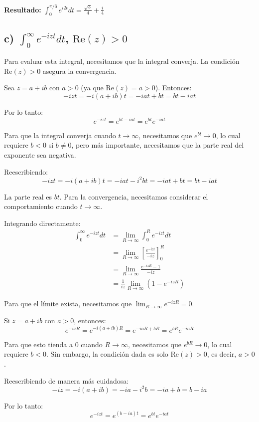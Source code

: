 \documentclass{article}
\begin{document}
\textbf{Resultado:} $\int_0^{\pi/6} e^{i2t} dt = \frac{\sqrt{3}}{4} + \frac{i}{4}$

\subsection*{c) $\int_0^{\infty} e^{-izt} dt$, $\text{Re}(z) > 0$}

Para evaluar esta integral, necesitamos que la integral converja. La condición $\text{Re}(z) > 0$ asegura la convergencia.

Sea $z = a + ib$ con $a > 0$ (ya que $\text{Re}(z) = a > 0$). Entonces:
$$-izt = -i(a + ib)t = -iat + bt = bt - iat$$

Por lo tanto:
$$e^{-izt} = e^{bt - iat} = e^{bt} e^{-iat}$$

Para que la integral converja cuando $t \to \infty$, necesitamos que $e^{bt} \to 0$, lo cual requiere $b < 0$ si $b \neq 0$, pero más importante, necesitamos que la parte real del exponente sea negativa.

Reescribiendo:
$$-izt = -i(a + ib)t = -iat - i^2bt = -iat + bt = bt - iat$$

La parte real es $bt$. Para la convergencia, necesitamos considerar el comportamiento cuando $t \to \infty$.

Integrando directamente:
\begin{align*}
\int_0^{\infty} e^{-izt} dt &= \lim_{R \to \infty} \int_0^R e^{-izt} dt \\
                            &= \lim_{R \to \infty} \left[\frac{e^{-izt}}{-iz}\right]_0^R \\
                            &= \lim_{R \to \infty} \frac{e^{-izR} - 1}{-iz} \\
                            &= \frac{1}{iz} \lim_{R \to \infty} (1 - e^{-izR})
\end{align*}

Para que el límite exista, necesitamos que $\lim_{R \to \infty} e^{-izR} = 0$.

Si $z = a + ib$ con $a > 0$, entonces:
$$e^{-izR} = e^{-i(a + ib)R} = e^{-iaR + bR} = e^{bR} e^{-iaR}$$

Para que esto tienda a 0 cuando $R \to \infty$, necesitamos que $e^{bR} \to 0$, lo cual requiere $b < 0$. Sin embargo, la condición dada es solo $\text{Re}(z) > 0$, es decir, $a > 0$.

Reescribiendo de manera más cuidadosa:
$$-iz = -i(a + ib) = -ia - i^2b = -ia + b = b - ia$$

Por lo tanto:
$$e^{-izt} = e^{(b - ia)t} = e^{bt} e^{-iat}$$
\end{document}
